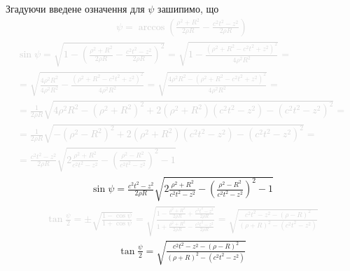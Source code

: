 Згадуючи введене означення для $ \psi $ зашипимо, що
%
\textcolor{lightgray}{ \begin{equation*} \begin{aligned}
\psi = \arccos \left( \frac{\rho^2 + R^2}{2 \rho R} - 
\frac{c^2 t^2 - z^2}{2 \rho R} \right)
\end{aligned} \end{equation*} }
%
\textcolor{lightgray}{ \begin{equation*} \begin{aligned}
\sin \psi = \sqrt{1 - \left( \frac{\rho^2 + R^2}{2 \rho R} - 
\frac{c^2 t^2 - z^2}{2 \rho R} \right)^2} = 
\sqrt{1 - \frac{\left( \rho^2 + R^2 - c^2 t^2 + z^2 \right)^2}
{4 \rho^2 R^2} } = \\ = \sqrt{\frac{4 \rho^2 R^2}{4 \rho^2 R^2} - 
\frac{\left( \rho^2 + R^2 - c^2 t^2 + z^2 \right)^2}{4 \rho^2 R^2} } =
\sqrt{\frac{4 \rho^2 R^2 - \left( \rho^2 + R^2 - c^2 t^2 + z^2 \right)^2}
{4 \rho^2 R^2}} = \\
= \frac{1}{2 \rho R} \sqrt{4 \rho^2 R^2 - \left( \rho^2 + R^2 \right)^2 +
2 \left( \rho^2 + R^2 \right) \left( c^2 t^2 - z^2 \right) - 
\left( c^2 t^2 - z^2 \right)^2} = \\
= \frac{1}{2 \rho R} \sqrt{- \left( \rho^2 - R^2 \right)^2 +
2 \left( \rho^2 + R^2 \right) \left( c^2 t^2 - z^2 \right) - 
\left( c^2 t^2 - z^2 \right)^2} = \\
= \frac{c^2 t^2 - z^2}{2 \rho R} \sqrt{2 \frac{\rho^2 + R^2 }{c^2 t^2 - z^2} - 
\left( \frac{\rho^2 - R^2 }{c^2 t^2 - z^2} \right)^2 - 1}
\end{aligned} \end{equation*} }
%
\begin{equation*} \begin{aligned}
\sin \psi = \frac{c^2 t^2 - z^2}{2 \rho R} 
\sqrt{2 \frac{\rho^2 + R^2 }{c^2 t^2 - z^2} - 
\left( \frac{\rho^2 - R^2 }{c^2 t^2 - z^2} \right)^2 - 1}
\end{aligned} \end{equation*}
%
\textcolor{lightgray}{ \begin{equation*} \begin{aligned}
\tan \frac{\psi}{2} = \pm \sqrt{ \frac{1 - \cos \psi}{1 + \cos \psi} } = 
\sqrt{ \frac{1- \frac{\rho^2 + R^2}{2 \rho R} + \frac{c^2 t^2 - z^2}{2 \rho R}}
{1 + \frac{\rho^2 + R^2}{2 \rho R} - \frac{c^2 t^2 - z^2}{2 \rho R}} } =
\sqrt{ \frac{c^2t^2 - z^2 - \left( \rho - R \right)^2}
{\left( \rho + R \right)^2 - \left( c^2t^2 - z^2 \right)} }
\end{aligned} \end{equation*} }
%
\begin{equation*} \begin{aligned}
\tan \frac{\psi}{2} = 
\sqrt{ \frac{c^2t^2 - z^2 - \left( \rho - R \right)^2}
{\left( \rho + R \right)^2 - \left( c^2t^2 - z^2 \right)} }
\end{aligned} \end{equation*}

